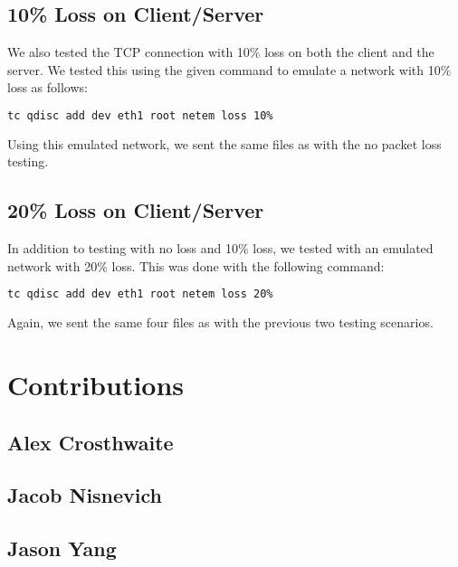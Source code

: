 \documentclass{article}
\begin{document}
\subsection{10\% Loss on Client/Server}

We also tested the TCP connection with 10\% loss on both the client and the server. We tested this using the given command to emulate a network with 10\% loss as follows:

\begin{lstlisting}[language=bash]
tc qdisc add dev eth1 root netem loss 10%
\end{lstlisting}

\noindent
Using this emulated network, we sent the same files as with the no packet loss testing.

\subsection{20\% Loss on Client/Server}

In addition to testing with no loss and 10\% loss, we tested with an emulated network with 20\% loss. This was done with the following command:

\begin{lstlisting}[language=bash]
tc qdisc add dev eth1 root netem loss 20%
\end{lstlisting}

\noindent
Again, we sent the same four files as with the previous two testing scenarios.

\section{Contributions}

\subsection{Alex Crosthwaite}

\subsection{Jacob Nisnevich}

\subsection{Jason Yang}
\end{document}
